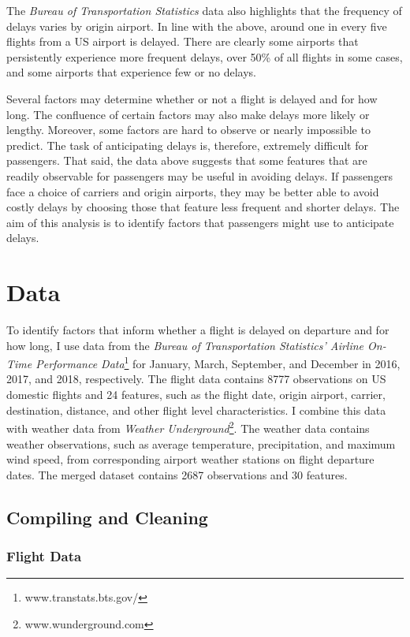 \documentclass[
]{article}
\begin{document}
The \textit{Bureau of Transportation Statistics} data also highlights
that the frequency of delays varies by origin airport. In line with the
above, around one in every five flights from a US airport is delayed.
There are clearly some airports that persistently experience more
frequent delays, over 50\% of all flights in some cases, and some
airports that experience few or no delays.

Several factors may determine whether or not a flight is delayed and for
how long. The confluence of certain factors may also make delays more
likely or lengthy. Moreover, some factors are hard to observe or nearly
impossible to predict. The task of anticipating delays is, therefore,
extremely difficult for passengers. That said, the data above suggests
that some features that are readily observable for passengers may be
useful in avoiding delays. If passengers face a choice of carriers and
origin airports, they may be better able to avoid costly delays by
choosing those that feature less frequent and shorter delays. The aim of
this analysis is to identify factors that passengers might use to
anticipate delays.

\section{Data}

To identify factors that inform whether a flight is delayed on departure
and for how long, I use data from the
\textit{Bureau of Transportation Statistics' Airline On-Time Performance Data}\footnote{www.transtats.bts.gov/}
for January, March, September, and December in 2016, 2017, and 2018,
respectively. The flight data contains 8777 observations on US domestic
flights and 24 features, such as the flight date, origin airport,
carrier, destination, distance, and other flight level characteristics.
I combine this data with weather data from
\textit{Weather Underground}\footnote{www.wunderground.com}. The weather
data contains weather observations, such as average temperature,
precipitation, and maximum wind speed, from corresponding airport
weather stations on flight departure dates. The merged dataset contains
2687 observations and 30 features.

\subsection{Compiling and Cleaning}

\subsubsection{Flight Data}
\end{document}
